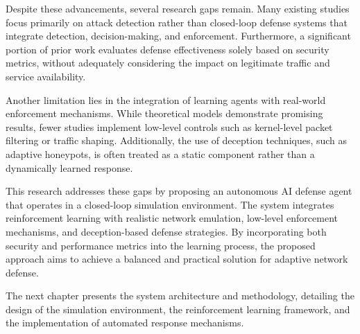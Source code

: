 \documentclass[12pt,a4paper]{report}
\begin{document}
Despite these advancements, several research gaps remain.
Many existing studies focus primarily on attack detection rather than closed-loop defense systems that integrate detection, decision-making, and enforcement.
Furthermore, a significant portion of prior work evaluates defense effectiveness solely based on security metrics, without adequately considering the impact on legitimate traffic and service availability.

Another limitation lies in the integration of learning agents with real-world enforcement mechanisms.
While theoretical models demonstrate promising results, fewer studies implement low-level controls such as kernel-level packet filtering or traffic shaping.
Additionally, the use of deception techniques, such as adaptive honeypots, is often treated as a static component rather than a dynamically learned response.

This research addresses these gaps by proposing an autonomous AI defense agent that operates in a closed-loop simulation environment.
The system integrates reinforcement learning with realistic network emulation, low-level enforcement mechanisms, and deception-based defense strategies.
By incorporating both security and performance metrics into the learning process, the proposed approach aims to achieve a balanced and practical solution for adaptive network defense.

The next chapter presents the system architecture and methodology, detailing the design of the simulation environment, the reinforcement learning framework, and the implementation of automated response mechanisms.



\end{document}
